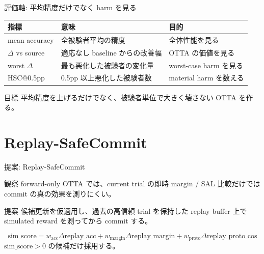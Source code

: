 \documentclass[unicode,aspectratio=169,12pt]{beamer}
\makeatletter
\newcommand{\hsc}{HSC@0.5pp}
\makeatother
\begin{document}
\begin{frame}{評価軸: 平均精度だけでなく harm を見る}
  \begin{table}
    \centering
    \begin{tabular}{p{}p{}p{}}
      \toprule
      指標 & 意味 & 目的 \\
      \midrule
      mean accuracy & 全被験者平均の精度 & 全体性能を見る \\
      $\Delta$ vs source & 適応なし baseline からの改善幅 & OTTA の価値を見る \\
      worst $\Delta$ & 最も悪化した被験者の変化量 & worst-case harm を見る \\
      \hsc & 0.5pp 以上悪化した被験者数 & material harm を数える \\
      \bottomrule
    \end{tabular}
  \end{table}
  \vspace{0.5em}
  \begin{block}{目標}
    平均精度を上げるだけでなく、被験者単位で大きく壊さない OTTA を作る。
  \end{block}
\end{frame}

\section{Replay-SafeCommit}

\begin{frame}{提案: Replay-SafeCommit}
  \begin{block}{観察}
    forward-only OTTA では、current trial の即時 margin / SAL 比較だけでは commit の真の効果を測りにくい。
  \end{block}
  \vspace{0.5em}
  \begin{block}{提案}
    候補更新を仮適用し、過去の高信頼 trial を保持した replay buffer 上で simulated reward を測ってから commit する。
  \end{block}
  \vspace{0.5em}
  \[
    \mathrm{sim\_score}
    = w_{\mathrm{acc}}\Delta \mathrm{replay\_acc}
    + w_{\mathrm{margin}}\Delta \mathrm{replay\_margin}
    + w_{\mathrm{proto}}\Delta \mathrm{replay\_proto\_cos}
  \]
  \centering
  \large $\mathrm{sim\_score} > 0$ の候補だけ採用する。
\end{frame}
\end{document}
